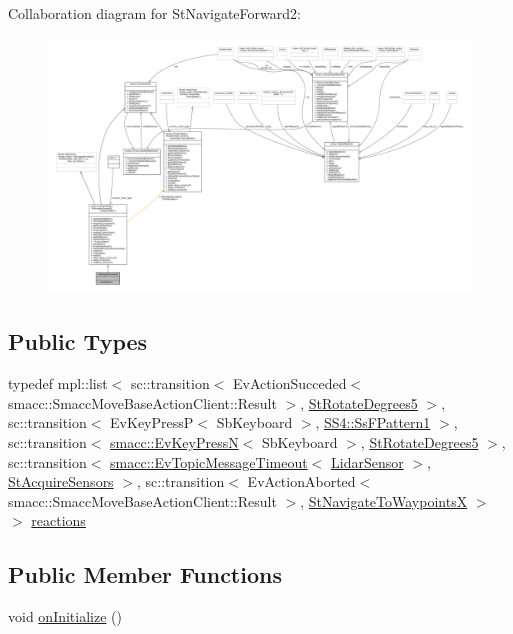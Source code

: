 Collaboration diagram for St\+Navigate\+Forward2\+:
\nopagebreak
\begin{figure}[H]
\begin{center}
\leavevmode
\includegraphics[width=350pt]{structStNavigateForward2__coll__graph}
\end{center}
\end{figure}
\subsection*{Public Types}
\begin{DoxyCompactItemize}
\item 
typedef mpl\+::list$<$ sc\+::transition$<$ Ev\+Action\+Succeded$<$ smacc\+::\+Smacc\+Move\+Base\+Action\+Client\+::\+Result $>$, \hyperlink{structStRotateDegrees5}{St\+Rotate\+Degrees5} $>$, sc\+::transition$<$ Ev\+Key\+PressP$<$ Sb\+Keyboard $>$, \hyperlink{structSS4_1_1SsFPattern1}{S\+S4\+::\+Ss\+F\+Pattern1} $>$, sc\+::transition$<$ \hyperlink{structsmacc_1_1EvKeyPressN}{smacc\+::\+Ev\+Key\+PressN}$<$ Sb\+Keyboard $>$, \hyperlink{structStRotateDegrees5}{St\+Rotate\+Degrees5} $>$, sc\+::transition$<$ \hyperlink{structsmacc_1_1EvTopicMessageTimeout}{smacc\+::\+Ev\+Topic\+Message\+Timeout}$<$ \hyperlink{sensor__state_8h_a9db9e1944f88de79507758d08e4a2ee3}{Lidar\+Sensor} $>$, \hyperlink{structStAcquireSensors}{St\+Acquire\+Sensors} $>$, sc\+::transition$<$ Ev\+Action\+Aborted$<$ smacc\+::\+Smacc\+Move\+Base\+Action\+Client\+::\+Result $>$, \hyperlink{structStNavigateToWaypointsX}{St\+Navigate\+To\+WaypointsX} $>$ $>$ \hyperlink{structStNavigateForward2_ac2745a7f9185d2901525ff3ed95b854a}{reactions}
\end{DoxyCompactItemize}
\subsection*{Public Member Functions}
\begin{DoxyCompactItemize}
\item 
void \hyperlink{structStNavigateForward2_ac08065dc561a98ca39edaed1982aa986}{on\+Initialize} ()
\end{DoxyCompactItemize}

